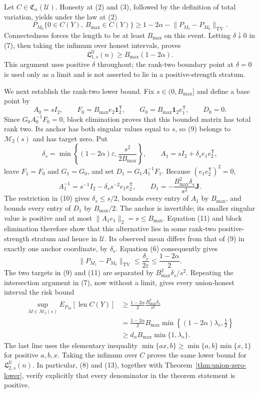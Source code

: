 Let \(C\in\mathfrak C_\alpha(\mathcal U)\).  Honesty at (2) and (3), followed by the definition of total variation, yields under the law at (2)
\[
 P_{M_0}\{0\in C(Y),\ B_{\max}\in C(Y)\}
 \geq1-2\alpha-\lVert P_{M_\delta}-P_{M_0}\rVert_{\mathrm{TV}}.
\tag{7}
\]
Connectedness forces the length to be at least \(B_{\max}\) on this event.  Letting \(\delta\downarrow0\) in (7), then taking the infimum over honest intervals, proves
\[
 \mathfrak L_{1,s}^{\mathcal U}(n)\geq B_{\max}(1-2\alpha).
\tag{8}
\]
This argument uses positive \(\delta\) throughout; the rank-two boundary point at \(\delta=0\) is used only as a limit and is not asserted to lie in a positive-strength stratum.

We next establish the rank-two lower bound.  Fix \(s\in(0,B_{\max}]\) and define a base point by
\[
 A_0=sI_2,\qquad
 F_0=B_{\max}e_2\mathbf1_2^{\mathsf T},\qquad
 G_0=B_{\max}\mathbf1_2e_1^{\mathsf T},\qquad
 D_0=0.
\tag{9}
\]
Since \(G_0A_0^{-1}F_0=0\), block elimination proves that this bounded matrix has total rank two.  Its anchor has both singular values equal to \(s\), so (9) belongs to \(\mathcal M_2(s)\) and has target zero.  Put
\[
 \delta_s=\min\left\{(1-2\alpha)\varepsilon,
 \frac{s^2}{2B_{\max}}\right\},
 \qquad
 A_1=sI_2+\delta_s e_1e_2^{\mathsf T},
\tag{10}
\]
leave \(F_1=F_0\) and \(G_1=G_0\), and set \(D_1=G_1A_1^{-1}F_1\).  Because \((e_1e_2^{\mathsf T})^2=0\),
\[
 A_1^{-1}=s^{-1}I_2-\delta_ss^{-2}e_1e_2^{\mathsf T},
 \qquad
 D_1=-\frac{B_{\max}^2\delta_s}{s^2}\mathbf J.
\tag{11}
\]
The restriction in (10) gives \(\delta_s\leq s/2\), bounds every entry of \(A_1\) by \(B_{\max}\), and bounds every entry of \(D_1\) by \(B_{\max}/2\).  The anchor is invertible; its smaller singular value is positive and at most \(\lVert A_1e_1\rVert_2=s\leq B_{\max}\).  Equation (11) and block elimination therefore show that this alternative lies in some rank-two positive-strength stratum and hence in \(\mathcal U\).  Its observed mean differs from that of (9) in exactly one anchor coordinate, by \(\delta_s\).  Equation (6) consequently gives
\[
 \lVert P_{M_1}-P_{M_0}\rVert_{\mathrm{TV}}
 \leq\frac{\delta_s}{2\varepsilon}
 \leq\frac{1-2\alpha}{2}.
\tag{12}
\]
The two targets in (9) and (11) are separated by \(B_{\max}^2\delta_s/s^2\).  Repeating the intersection argument in (7), now without a limit, gives every union-honest interval the risk bound
\[
 \begin{split}
 \sup_{M\in\mathcal M_2(s)}E_{P_M}[\operatorname{len}C(Y)]
 &\geq\frac{1-2\alpha}{2}\frac{B_{\max}^2\delta_s}{s^2}\\
 &=\frac{1-2\alpha}{2}B_{\max}
 \min\left\{(1-2\alpha)\lambda_s,\frac12\right\}\\
 &\geq d_\alpha B_{\max}\min\{1,\lambda_s\}.
 \end{split}
\tag{13}
\]
The last line uses the elementary inequality \(\min\{ax,b\}\geq\min\{a,b\}\min\{x,1\}\) for positive \(a,b,x\).  Taking the infimum over \(C\) proves the same lower bound for \(\mathfrak L_{2,s}^{\mathcal U}(n)\).  In particular, (8) and (13), together with Theorem~\ref{thm:union-zero-lower}, verify explicitly that every denominator in the theorem statement is positive.

